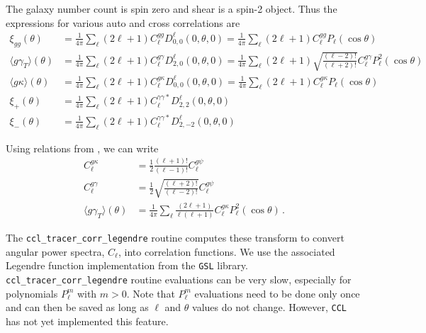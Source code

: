 \documentclass[\docopts]{\docclass}
\newcommand{\ccl}{{\tt CCL}\xspace}
\begin{document}
The galaxy number count is spin zero and shear is a spin-2 object. Thus the expressions for various auto and cross correlations are
\begin{align}
  \xi_{gg}(\theta)&=\frac{1}{4\pi}\sum_{\ell}{(2\ell+1)}C_{\ell}^{gg}D^{\ell}_{0,0}(0,\theta,0)=
  \frac{1}{4\pi}\sum_{\ell}{(2\ell+1)}C_{\ell}^{gg}P_{\ell}(\cos\theta)\label{eq:xi_gg_D}\\
  \langle g\gamma_T\rangle(\theta)&=
  \frac{1}{4\pi}\sum_{\ell}{(2\ell+1)}C_{\ell}^{g\gamma}D^{\ell}_{2,0}(0,\theta,0)=
  \frac{1}{4\pi}\sum_{\ell}(2\ell+1)\sqrt{\frac{(\ell-2)!}{(\ell+2)!}}C_{\ell}^{g\gamma}
  P_{\ell}^2(\cos\theta)\label{eq:xi_g_gamma_D}\\
  \langle g\kappa\rangle(\theta)&=
  \frac{1}{4\pi}\sum_{\ell}{(2\ell+1)}C_{\ell}^{g\kappa}D^{\ell}_{0,0}(0,\theta,0)=
  \frac{1}{4\pi}\sum_{\ell}(2\ell+1)C_{\ell}^{g\kappa}
  P_{\ell}(\cos\theta)\label{eq:xi_g_kappa_D}\\
  \xi_+(\theta)&=\frac{1}{4\pi}\sum_{\ell}{(2\ell+1)}C_{\ell}^{\gamma\gamma*}
  D^{\ell}_{2,2}(0,\theta,0)\label{eq:xi_p_D}\\
  \xi_-(\theta)&=\frac{1}{4\pi}\sum_{\ell}{(2\ell+1)}C_{\ell}^{\gamma\gamma*}
  D^{\ell}_{2,-2}(0,\theta,0)
  \label{eq:xi_m_D}
\end{align}

Using relations from \cite{Kilbinger2017}, we can write
\begin{align}
  C_{\ell}^{g\kappa}&={\frac{1}{2}\frac{(\ell+1)!}{(\ell-1)!}}C_{\ell}^{g\psi}\\
  C_{\ell}^{g\gamma}&=\frac{1}{2}\sqrt{\frac{(\ell+2)!}{(\ell-2)!}}C_{\ell}^{g\psi}
  \\ \langle g\gamma_T\rangle(\theta)&
  =\frac{1}{4\pi}\sum_{\ell}\frac{(2\ell+1)}{\ell(\ell+1)}C_{\ell}^{g\kappa}P_{\ell}^2(\cos\theta)
  \label{eq:xi_g_gamma}\,.
\end{align}

The {\tt ccl\_tracer\_corr\_legendre} routine computes these transform to convert angular power
spectra, $C_\ell$, into correlation functions. We use the associated Legendre function
implementation from the {\tt GSL} library. {\tt ccl\_tracer\_corr\_legendre} routine evaluations
can be very slow, especially for polynomials $P_\ell^m$ with $m>0$. Note that $P_\ell^m$
evaluations need to be done only once and can then be saved as long as $\ell$ and $\theta$ values
do not change. However, \ccl has not yet implemented this feature.
\end{document}
